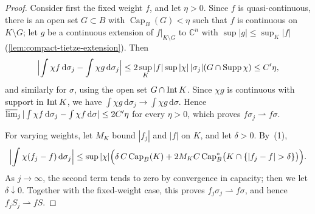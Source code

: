 \begin{proof}
Consider first the fixed weight $f$, and let $\eta>0$. Since $f$ is quasi-continuous, there is an open set $G\subset B$ with $\operatorname{Cap}_B(G)<\eta$ such that $f$ is continuous on $K\setminus G$; let $g$ be a continuous extension of $f|_{K\setminus G}$ to $\mathbb C^n$ with $\sup|g|\le\sup_K|f|$ (\cref{lem:compact-tietze-extension}). Then
\[
 \Bigl|\int\chi f\,\mathrm{d}\sigma_j-\int\chi g\,\mathrm{d}\sigma_j\Bigr|\le2\sup_K|f|\sup|\chi|\,|\sigma_j|(G\cap\operatorname{Supp}\chi)\le C'\eta,
\]
and similarly for $\sigma$, using the open set $G\cap\operatorname{Int} K$. Since $\chi g$ is continuous with support in $\operatorname{Int} K$, we have $\int\chi g\,\mathrm{d}\sigma_j\to\int\chi g\,\mathrm{d}\sigma$. Hence $\varlimsup_j|\int\chi f\,\mathrm{d}\sigma_j-\int\chi f\,\mathrm{d}\sigma|\le2C'\eta$ for every $\eta>0$, which proves $f\sigma_j\rightharpoonup f\sigma$.

For varying weights, let $M_K$ bound $|f_j|$ and $|f|$ on $K$, and let $\delta>0$. By~(1),
\[
 \Bigl|\int\chi(f_j-f)\,\mathrm{d}\sigma_j\Bigr|
 \le\sup|\chi|\Bigl(\delta\,C\operatorname{Cap}_B(K)+2M_KC\operatorname{Cap}^*_B\bigl(K\cap\{|f_j-f|>\delta\}\bigr)\Bigr).
\]
As $j\to\infty$, the second term tends to zero by convergence in capacity; then we let $\delta\downarrow0$. Together with the fixed-weight case, this proves $f_j\sigma_j\rightharpoonup f\sigma$, and hence $f_jS_j\rightharpoonup fS$.
\end{proof}


